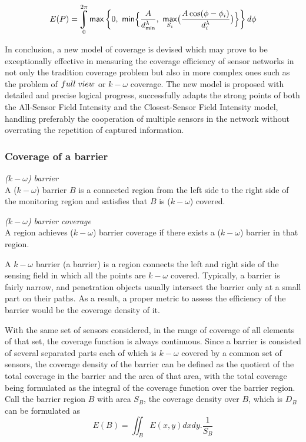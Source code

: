 $$E(P) = \uint\limits_0^{2\pi}{\mathsf{max}\left\{0,\ \mathsf{min}\Big\{\frac{A}{d_{\mathsf{min}}^\lambda}, \ \underset{S_i}{\mathsf{max}}\big(\frac{A\cos(\phi - \phi_i)}{d_i^\lambda}\big)\Big\}\right\}d\phi}$$

In conclusion, a new model of coverage is devised which may prove to be exceptionally effective in measuring the coverage efficiency of sensor networks in not only the tradition coverage problem but also in more complex ones such as the problem of $full\hspace{1mm}view$ or $k-\omega$ coverage. The new model is proposed with detailed and precise logical progress, successfully adapts the strong points of both the All-Sensor Field Intensity and the Closest-Sensor Field Intensity model, handling preferably the cooperation of multiple sensors in the network without overrating the repetition of captured information.

\subsubsection{Coverage of a barrier}
\label{barrier}

\begin{df}{\itshape($k-\omega$) barrier}\\
	A ($k-\omega$) barrier $B$ is a connected region from the left side to the right side of the monitoring region and satisfies that $B$ is ($k-\omega$) covered.
\end{df}
\begin{df}{\itshape($k-\omega$) barrier coverage}\\
	A region achieves ($k-\omega$) barrier coverage if there exists a ($k-\omega$) barrier in that region.\par
\end{df}

A $k-\omega$ barrier (a barrier) is a region connects the left and right side of the sensing field in which all the points are $k-\omega$ covered. Typically, a barrier is fairly narrow, and penetration objects usually intersect the barrier only at a small part on their paths. As a result, a proper metric to assess the efficiency of the barrier would be the coverage density of it.

With the same set of sensors considered, in the range of coverage of all elements of that set, the coverage function is always continuous. Since a barrier is consisted of several separated parts each of which is $k-\omega$ covered by a common set of sensors, the coverage density of the barrier can be defined as the quotient of the total coverage in the barrier and the area of that area, with the total coverage being formulated as the integral of the coverage function over the barrier region. Call the barrier region $B$ with area $S_B$, the coverage density over $B$, which is $D_B$ can be formulated as
\begin{equation}
\label{eqE1}
E(B) = \iint_B{E(x, y)dxdy}.\frac{1}{S_B}
\end{equation}

